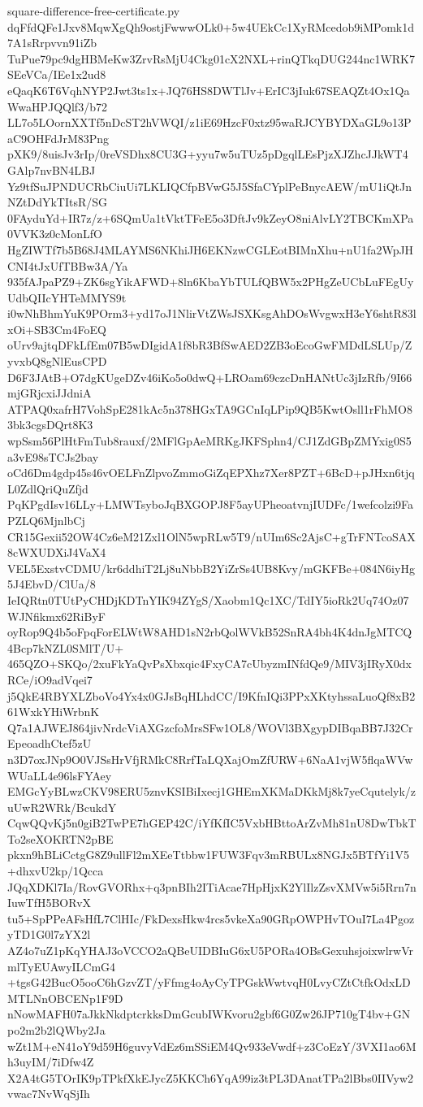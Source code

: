 \documentclass[11pt]{article}
\theoremstyle{definition}
\theoremstyle{remark}
\begin{document}
\begin{filecontents*}[overwrite]{square-difference-free-certificate.py}
dqFfdQFe1Jxv8MqwXgQh9ostjFwwwOLk0+5w4UEkCc1XyRMcedob9iMPomk1d7A1sRrpvvn91iZb
TuPue79pc9dgHBMeKw3ZrvRsMjU4Ckg01cX2NXL+rinQTkqDUG244nc1WRK7SEeVCa/IEe1x2ud8
eQaqK6T6VqhNYP2Jwt3ts1x+JQ76HS8DWTlJv+ErIC3jIuk67SEAQZt4Ox1QaWwaHPJQQlf3/b72
LL7o5LOornXXTf5nDcST2hVWQI/z1iE69HzcF0xtz95waRJCYBYDXaGL9o13PaC9OHFdJrM83Png
pXK9/8uisJv3rIp/0reVSDhx8CU3G+yyu7w5uTUz5pDgqlLEsPjzXJZhcJJkWT4GAlp7nvBN4LBJ
Yz9tfSuJPNDUCRbCiuUi7LKLIQCfpBVwG5J5SfaCYplPeBnycAEW/mU1iQtJnNZtDdYkTItsR/SG
0FAyduYd+IR7z/z+6SQmUa1tVktTFeE5o3DftJv9kZeyO8niAlvLY2TBCKmXPa0VVK3z0cMonLfO
HgZIWTf7b5B68J4MLAYMS6NKhiJH6EKNzwCGLEotBIMnXhu+nU1fa2WpJHCNI4tJxUfTBBw3A/Ya
935fAJpaPZ9+ZK6sgYikAFWD+8ln6KbaYbTULfQBW5x2PHgZeUCbLuFEgUyUdbQIIcYHTeMMYS9t
i0wNhBhmYuK9POrm3+yd17oJ1NlirVtZWsJSXKsgAhDOsWvgwxH3eY6shtR83lxOi+SB3Cm4FoEQ
oUrv9ajtqDFkLfEm07B5wDIgidA1f8bR3BfSwAED2ZB3oEcoGwFMDdLSLUp/ZyvxbQ8gNlEusCPD
D6F3JAtB+O7dgKUgeDZv46iKo5o0dwQ+LROam69czcDnHANtUc3jIzRfb/9I66mjGRjcxiJJdniA
ATPAQ0xafrH7VohSpE281kAc5n378HGxTA9GCnIqLPip9QB5KwtOsll1rFhMO83bk3cgsDQrt8K3
wpSsm56PlHtFmTub8rauxf/2MFlGpAeMRKgJKFSphn4/CJ1ZdGBpZMYxig0S5a3vE98sTCJs2bay
oCd6Dm4gdp45s46vOELFnZlpvoZmmoGiZqEPXhz7Xer8PZT+6BcD+pJHxn6tjqL0ZdlQriQuZfjd
PqKPgdIsv16LLy+LMWTsyboJqBXGOPJ8F5ayUPheoatvnjIUDFc/1wefcolzi9FaPZLQ6MjnlbCj
CR15Gexii52OW4Cz6eM21Zxl1OlN5wpRLw5T9/nUIm6Sc2AjsC+gTrFNTcoSAX8cWXUDXiJ4VaX4
VEL5ExstvCDMU/kr6ddhiT2Lj8uNbbB2YiZrSs4UB8Kvy/mGKFBe+084N6iyHg5J4EbvD/ClUa/8
IeIQRtn0TUtPyCHDjKDTnYIK94ZYgS/Xaobm1Qc1XC/TdIY5ioRk2Uq74Oz07WJNfikmx62RiByF
oyRop9Q4b5oFpqForELWtW8AHD1sN2rbQolWVkB52SnRA4bh4K4dnJgMTCQ4Bcp7kNZL0SMlT/U+
465QZO+SKQo/2xuFkYaQvPsXbxqic4FxyCA7cUbyzmINfdQe9/MIV3jIRyX0dxRCe/iO9adVqei7
j5QkE4RBYXLZboVo4Yx4x0GJsBqHLhdCC/I9KfnIQi3PPxXKtyhssaLuoQf8xB261WxkYHiWrbnK
Q7a1AJWEJ864jivNrdcViAXGzcfoMrsSFw1OL8/WOVl3BXgypDIBqaBB7J32CrEpeoadhCtef5zU
n3D7oxJNp9O0VJSsHrVfjRMkC8RrfTaLQXajOmZfURW+6NaA1vjW5flqaWVwWUaLL4e96lsFYAey
EMGcYyBLwzCKV98ERU5znvKSIBiIxecj1GHEmXKMaDKkMj8k7yeCqutelyk/zuUwR2WRk/BcukdY
CqwQQvKj5n0giB2TwPE7hGEP42C/iYfKfIC5VxbHBttoArZvMh81nU8DwTbkTTo2seXOKRTN2pBE
pkxn9hBLiCctgG8Z9ullFl2mXEeTtbbw1FUW3Fqv3mRBULx8NGJx5BTfYi1V5+dhxvU2kp/1Qcca
JQqXDKl7Ia/RovGVORhx+q3pnBIh2ITiAcae7HpHjxK2YlIlzZsvXMVw5i5Rrn7nIuwTfH5BORvX
tu5+SpPPeAFsHfL7ClHIc/FkDexsHkw4rcs5vkeXa90GRpOWPHvTOuI7La4PgozyTD1G0l7zYX2l
AZ4o7uZ1pKqYHAJ3oVCCO2aQBeUIDBIuG6xU5PORa4OBsGexuhsjoixwlrwVrmlTyEUAwyILCmG4
+tgsG42BucO5ooC6hGzvZT/yFfmg4oAyCyTPGskWwtvqH0LvyCZtCtfkOdxLDMTLNnOBCENp1F9D
nNowMAFH07aJkkNkdptcrkksDmGcubIWKvoru2gbf6G0Zw26JP710gT4bv+GNpo2m2b2lQWby2Ja
wZt1M+eN41oY9d59H6guvyVdEz6mSSiEM4Qv933eVwdf+z3CoEzY/3VXI1ao6Mh3uyIM/7iDfw4Z
X2A4tG5TOrIK9pTPkfXkEJycZ5KKCh6YqA99iz3tPL3DAnatTPa2lBbs0IIVyw2vwac7NvWqSjIh

\end{filecontents*}
\end{document}
